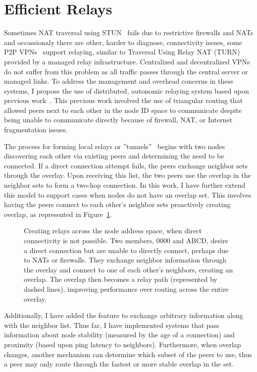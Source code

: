 \section{Efficient Relays}

Sometimes NAT traversal using STUN~\cite{stun} fails due to restrictive
firewalls and NATs and occassionaly there are other, harder to diagnose,
connectivity issues, some P2P VPNs~\cite{hamachi, gbridge} support relaying,
similar to Traversal Using Relay NAT (TURN)~\cite{turn} provided by a managed
relay infrastructure.  Centralized and decentralized VPNs do not suffer from
this problem as all traffic passes through the central server or managed links.
To address the management and overhead concerns in these systems, I propose the
use of distributed, autonomic relaying system based upon previous
work~\cite{hpdc08_0,epost}.  This previous work involved the use of triangular
routing that allowed peers next to each other in the node ID space to
communicate despite being unable to communicate directly because of firewall,
NAT, or Internet fragmentation issues.

The process for forming local relays or ''tunnels''~\cite{hpdc08_0} begins with
two nodes discovering each other via existing peers and determining the need to
be connected.  If a direct connection attempt fails, the peers exchange
neighbor sets through the overlay.  Upon receiving this list, the two peers use
the overlap in the neighbor sets to form a two-hop connection.  In this work, I
have further extend this model to support cases when nodes do not have an
overlap set.  This involves having the peers connect to each other's neighbor
sets proactively creating overlap, as represented in Figure~\ref{fig:relay}.

\begin{figure}[ht]
\centering
{}
\caption[Motivation for relays]{Creating relays across the node address space,
when direct connectivity is not possible.  Two members, 0000 and ABCD,  desire
a direct connection but are unable to directly connect, perhaps due to NATs or
firewalls.  They exchange neighbor information through the overlay and connect
to one of each other's neighbors, creating an overlap.  The overlap then
becomes a relay path (represented by dashed lines), improving performance over
routing across the entire overlay.}
\label{fig:relay}
\end{figure}

Additionally, I have added the feature to exchange arbitrary information along
with the neighbor list.  Thus far, I have implemented systems that pass
information about node stability (measured by the age of a connection) and
proximity (based upon ping latency to neighbors).  Furthermore, when overlap
changes, another mechanism can determine which subset of the peers to use, thus
a peer may only route through the fastest or more stable overlap in the set.

